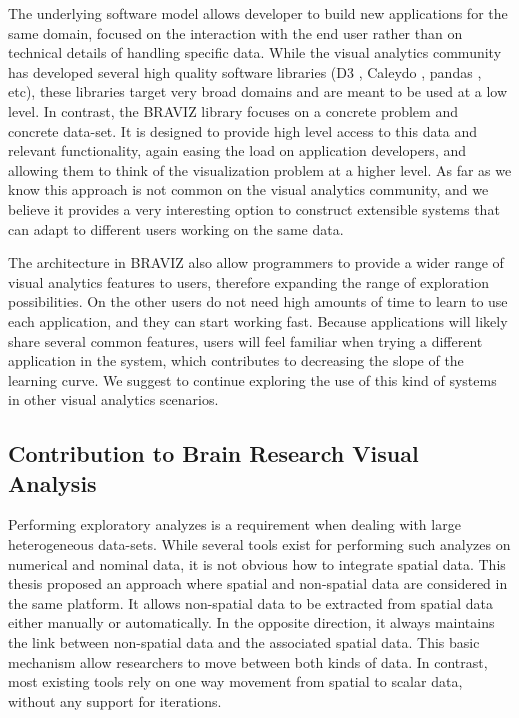 {The underlying software model allows developer to build new applications for the same domain, focused on the interaction with the end user rather than on technical details of handling specific data. While the visual analytics community has developed several high quality software libraries (D3 \autocite{bostock_d3_2011}, Caleydo \autocite{}, pandas \autocite{mckinney_data_2010}, etc), these libraries target very broad domains and are meant to be used at a low level. In contrast, the BRAVIZ library focuses on a concrete problem and concrete data-set. It is designed to provide high level access to this data and relevant functionality, again easing the load on application developers, and allowing them to think of the visualization problem at a higher level. As far as we know this approach is not common on the visual analytics community, and we believe it provides a very interesting option to construct extensible systems that can adapt to different users working on the same data. 

The architecture in BRAVIZ also allow programmers to provide a wider range of visual analytics features to users, therefore expanding the range of exploration possibilities. On the other users do not need high amounts of time to learn to use each application, and they can start working fast. Because applications will likely share several common features, users will feel familiar when trying a different application in the system, which contributes to decreasing the slope of the learning curve. We suggest to continue exploring the use of this kind of systems in other visual analytics scenarios.


\subsection{Contribution to Brain Research Visual Analysis }

Performing exploratory analyzes is a requirement when dealing with large heterogeneous data-sets. While several tools exist for performing such analyzes on numerical and nominal data, it is not obvious how to integrate spatial data. This thesis proposed an approach where spatial and non-spatial data are considered in the same platform. It allows non-spatial data to be extracted from spatial data either manually or automatically. In the opposite direction, it always maintains the link between non-spatial data and the associated spatial data. This basic mechanism allow researchers to move between both kinds of data. In contrast, most existing tools rely on one way movement from spatial to scalar data, without any support for iterations.

}
